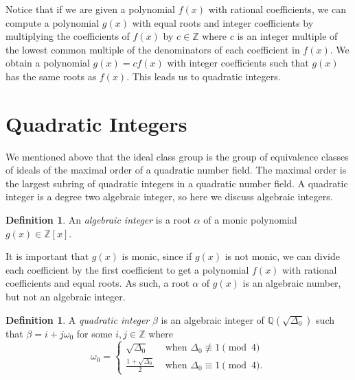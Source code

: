 \documentclass{ucalgthes1}
\theoremstyle{plain}
\theoremstyle{definition}
\newtheorem{defn}[thm]{Definition}
\newcommand{\ZZ}{\mathbb{Z}}
\newcommand{\QQ}{\mathbb{Q}}
\begin{document}
Notice that if we are given a polynomial $f(x)$ with rational coefficients, we can compute a polynomial $g(x)$ with equal roots and integer coefficients by multiplying the coefficients of $f(x)$ by $c \in \ZZ$ where $c$ is an integer multiple of the lowest common multiple of the denominators of each coefficient in $f(x)$.  We obtain a polynomial $g(x) = cf(x)$ with integer coefficients such that $g(x)$ has the same roots as $f(x)$.  This leads us to quadratic integers.


\bigbreak
\section{Quadratic Integers}

We mentioned above that the ideal class group is the group of equivalence classes of ideals of the maximal order of a quadratic number field.  The maximal order is the largest subring of quadratic integers in a quadratic number field.  A quadratic integer is a degree two algebraic integer, so here we discuss algebraic integers.

\begin{defn}
An \emph{algebraic integer} is a root $\alpha$ of a monic polynomial $g(x) \in \ZZ[x]$.
\end{defn}

\noindent
It is important that $g(x)$ is monic, since if $g(x)$ is not monic, we can divide each coefficient by the first coefficient to get a polynomial $f(x)$ with rational coefficients and equal roots.  As such, a root $\alpha$ of $g(x)$ is an algebraic number, but not an algebraic integer.


\begin{defn}
\label{defn:quadraticInteger}
A \emph{quadratic integer} $\beta$ is an algebraic integer of $\QQ(\sqrt{\Delta_0})$ such that $\beta = i + j \omega_0$ for some $i,j \in \ZZ$ where
\begin{equation*}
	\omega_0 = \begin{cases}
		\sqrt{\Delta_0} & \textrm{ when } \Delta_0 \not \equiv 1 \pmod 4 \\
		\frac{1+\sqrt{\Delta_0}}{2} & \textrm{ when } \Delta_0 \equiv 1 \pmod 4.
	\end{cases}
\end{equation*}
\end{defn}
\end{document}

